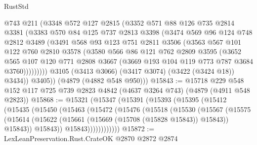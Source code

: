 \begin{lexlean}{RustStd}
\begin{coremodule}
              @743
              @211
              (@3348
                @572
                @127
                @2815
                (@3352
                  @571
                  @88
                  @126
                  @735
                  @2814
                  @3381
                  (@3383
                    @570
                    @84
                    @125
                    @737
                    @2813
                    @3398
                    (@3474
                      @569
                      @96
                      @124
                      @748
                      @2812
                      @3489
                      (@3491
                        @568
                        @93
                        @123
                        @751
                        @2811
                        @3506
                        (@3563
                          @567
                          @101
                          @122
                          @760
                          @2810
                          @3578
                          (@3580
                            @566
                            @86
                            @121
                            @762
                            @2809
                            @3595
                            (@3652
                              @565
                              @107
                              @120
                              @771
                              @2808
                              @3667
                              (@3669 @193 @104 @119 @773 @787 @3684 @3760)))))))))
              @3105
              (@3413 @3066)
              (@3417 @3074)
              (@3422 (@3424 @18))
              @3434))
          @3405))
      (@4879 (@4882 @548 @950)))
@15843 := @15718
    @229
    @548
    @152
    @117
    @725
    @739
    @2823
    @4842
    (@4637 @3264 @743)
    (@4879 (@4911 @548 @2823))
@15868 := @15321
    (@15347
      (@15391
        (@15393
          (@15395
            (@15412
              (@15435
                (@15450
                  (@15463
                    (@15472
                      (@15476
                        (@15518
                          (@15530
                            (@15567
                              (@15575
                                (@15614
                                  (@15622 (@15661 (@15669 (@15708 (@15828 @15843)) @15843)) @15843))
                                @15843))
                            @15843))))))))))))
@15872 := LexLeanPreservation.Rust.CrateOK @2870 @2872 @2874

\end{coremodule}
\end{lexlean}
